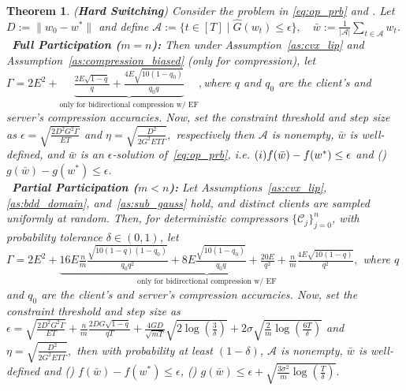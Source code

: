 \documentclass{article} %
\newtheorem{theorem}{Theorem}[]
\def\C{{\mathcal C}}
\def\A{{\mathcal A}}
\begin{document}
\begin{theorem}{(\textbf{Hard Switching})}
\label{thm:hard_fedsgm_unified}
Consider the problem in \ref{eq:op_prb} and . Let $D := \|w_0 - w^*\|$ and define
$
\mathcal{A} := \{ t \in [T] \;|\; \hat{G}(w_t) \le \epsilon \}, 
\quad 
\bar{w} := \frac{1}{|\mathcal{A}|} \sum_{t \in \mathcal{A}} w_t.
$\\
\textbullet\ \textbf{Full Participation ($m = n$):} Then under Assumption~\ref{as:cvx_lip} and        Assumption~\ref{as:compression_biased} (only for compression), let
        $
        \Gamma = 2E^2 
        + \underbrace{\frac{2E\sqrt{1-q}}{q} + \frac{4E\sqrt{10(1-q_0)}}{q_0 q}}_{\text{only for bidirectional compression w/ EF}}, 
        $where $q$ and $q_0$ are the client's and server's compression accuracies. Now, set the constraint threshold and step size  as $\epsilon = \sqrt{\frac{2 D^2 G^2 \Gamma}{E T}}$ and $
                    \eta = \sqrt{\frac{D^2}{2 G^2 E T \Gamma}},$ respectively then $\A$ is nonempty, $\bar{w}$ is well-defined, and $\bar{w}$ is an $\epsilon$-solution of~\ref{eq:op_prb}, i.e. $(\romannumeral 1) f(\bar{w})-f(w^*) \leq \epsilon$ and () $g(\bar{w})-g(w^*) \leq \epsilon.$
\\
\textbullet\ \textbf{Partial Participation ($m < n$):} Let Assumptions~\ref{as:cvx_lip},              \ref{as:bdd_domain}, and~\ref{as:sub_gauss}
    hold, and distinct clients are sampled uniformly at random. Then, for deterministic 
    compressors $\{\C_j\}_{j=0}^n$, with probability tolerance $\delta \in (0,1)$, let
        $
        \Gamma = 2E^2 
        + \underbrace{16 E\frac{n}{m}\frac{\sqrt{10(1-q) (1-q_0)}}{q_0q^2} + 8 E\frac{\sqrt{10(1-q_0)}}{q_0q} + \frac{20 E}{ q^2} + \frac{n}{m}\frac{4 E\sqrt{10(1-q)}}{ q^2} }_{\text{only for bidirectional compression w/ EF}}, 
        $ where $q$ and $q_0$ are the client's and server's compression accuracies. Now, set the constraint threshold and step size as $\epsilon = \sqrt{\frac{{2 D^2 G^2 \Gamma}}{{E T}}} + \frac{n}{m}\frac{2 DG\sqrt{1-q}}{qT}
        + \frac{4GD}{\sqrt{mT}}\sqrt{2\log\left(\frac{3}{\delta}\right)}
        + 2\sigma\sqrt{\frac{2}{m} \log\left(\frac{6T}{\delta}\right)} $ and $
        \eta = \sqrt{\frac{D^2}{2G^2 E T \Gamma}},$ then with probability at least $(1 - \delta)$, $\A$ is nonempty, $\bar{w}$ is well-defined and () $f(\bar{w})-f(w^*) \leq \epsilon$, () $g(\bar{w}) \leq \epsilon + \sqrt{\frac{3\sigma^2}{m} \log\!\left(\frac{T}{\delta}\right)}.$
\end{theorem}
\end{document}
